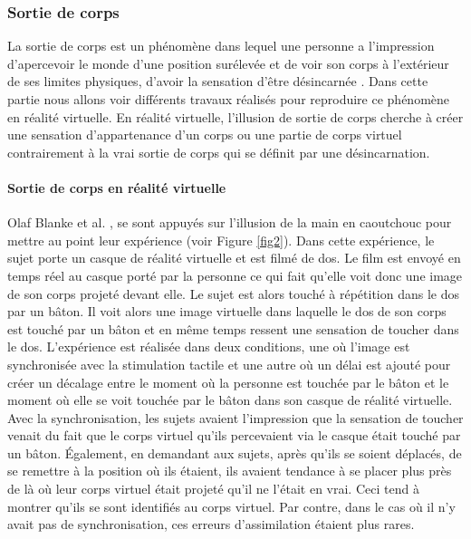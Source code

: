 \subsubsection{Sortie de corps}

La sortie de corps est un phénomène dans lequel une personne a l'impression d'apercevoir le monde d'une position surélevée et de voir son corps à l'extérieur de ses limites physiques, d'avoir la sensation d'être désincarnée \cite{bl10}. Dans cette partie nous allons voir différents travaux réalisés pour reproduire ce phénomène en réalité virtuelle. En réalité virtuelle, l'illusion de sortie de corps cherche à créer une sensation d'appartenance d'un corps ou une partie de corps virtuel contrairement à la vrai sortie de corps qui se définit par une désincarnation.

\paragraph{Sortie de corps en réalité virtuelle}

Olaf Blanke et al. \cite{le07}, se sont appuyés sur l'illusion de la main en caoutchouc pour mettre au point leur expérience (voir Figure \ref{fig2}). Dans cette expérience, le sujet porte un casque de réalité virtuelle et est filmé de dos. Le film est envoyé en temps réel au casque porté par la personne ce qui fait qu'elle voit donc une image de son corps projeté devant elle. Le sujet est alors touché à répétition dans le dos par un bâton. Il voit alors une image virtuelle dans laquelle le dos de son corps est touché par un bâton et en même temps ressent une sensation de toucher dans le dos. L'expérience est réalisée dans deux conditions, une où l'image est synchronisée avec la stimulation tactile et une autre où un délai est ajouté pour créer un décalage entre le moment où la personne est touchée par le bâton et le moment où elle se voit touchée par le bâton dans son casque de réalité virtuelle. Avec la synchronisation, les sujets avaient l'impression que la sensation de toucher venait du fait que le corps virtuel qu’ils percevaient via le casque était touché par un bâton. \'{E}galement, en demandant aux sujets, après qu'ils se soient déplacés, de se remettre à la position où ils étaient, ils avaient tendance à se placer plus près de là où leur corps virtuel était projeté qu'il ne l'était en vrai. Ceci tend à montrer qu'ils se sont identifiés au corps virtuel. Par contre, dans le cas où il n'y avait pas de synchronisation, ces erreurs d'assimilation étaient plus rares.\\

